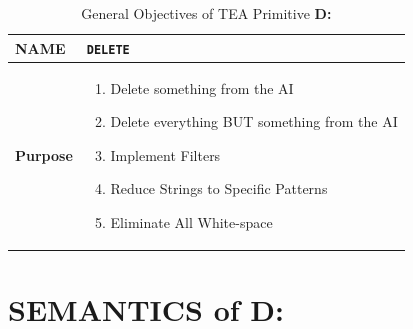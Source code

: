 \documentclass[a4paper, 18pt]{book} %
\begin{document}
\begin{table}[H]
  \centering
  \LARGE
	\begin{tabular}[t]{|p{}|p{}}
 
	\textbf{NAME} & \texttt{DELETE}\\
	\hline
	\textbf{Purpose} & \begin{enumerate}
	\item Delete something from the AI
	\item Delete everything BUT something from the AI
	\item Implement Filters
	\item Reduce Strings to Specific Patterns
	\item Eliminate All White-space
	\end{enumerate}\\
	\hline
	              
\end{tabular}
\caption{General Objectives of TEA Primitive \textbf{D:}}
  \label{TABTAZD}
\end{table}




\section{SEMANTICS of D:}
\label{SECSEMD}
\end{document}
